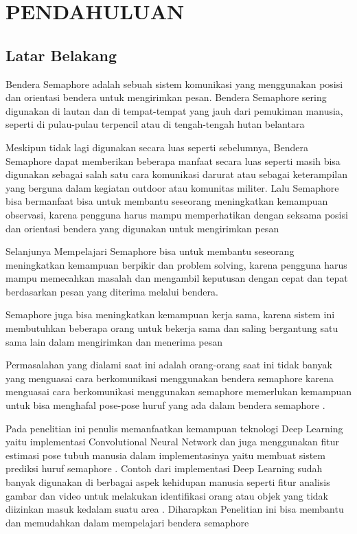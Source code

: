 \section{PENDAHULUAN}

\subsection{Latar Belakang}

Bendera Semaphore adalah sebuah sistem komunikasi yang menggunakan posisi dan orientasi bendera untuk mengirimkan pesan. Bendera Semaphore sering digunakan di lautan dan di tempat-tempat yang jauh dari pemukiman manusia, seperti di pulau-pulau terpencil atau di tengah-tengah hutan belantara

Meskipun tidak lagi digunakan secara luas seperti sebelumnya, Bendera Semaphore dapat memberikan beberapa manfaat secara luas seperti  masih bisa digunakan sebagai salah satu cara komunikasi darurat atau sebagai keterampilan yang berguna dalam kegiatan outdoor atau komunitas militer. Lalu Semaphore bisa bermanfaat bisa untuk membantu seseorang meningkatkan kemampuan observasi, karena pengguna harus mampu memperhatikan dengan seksama posisi dan orientasi bendera yang digunakan untuk mengirimkan pesan

Selanjunya Mempelajari Semaphore bisa untuk  membantu seseorang meningkatkan kemampuan berpikir dan problem solving, karena pengguna harus mampu memecahkan masalah dan mengambil keputusan dengan cepat dan tepat berdasarkan pesan yang diterima melalui bendera. 

Semaphore juga bisa meningkatkan kemampuan kerja sama, karena sistem ini membutuhkan beberapa orang untuk bekerja sama dan saling bergantung satu sama lain dalam mengirimkan dan menerima pesan

Permasalahan yang dialami saat ini adalah orang-orang saat ini tidak banyak yang menguasai cara berkomunikasi menggunakan bendera semaphore karena menguasai cara berkomunikasi menggunakan semaphore memerlukan kemampuan untuk bisa menghafal pose-pose huruf yang ada dalam bendera semaphore . 

Pada penelitian ini penulis memanfaatkan kemampuan teknologi Deep Learning yaitu implementasi Convolutional Neural Network dan juga menggunakan fitur estimasi pose tubuh manusia dalam implementasinya yaitu membuat sistem prediksi huruf semaphore . Contoh dari implementasi Deep Learning sudah banyak digunakan di berbagai aspek kehidupan manusia seperti fitur analisis gambar dan video untuk melakukan identifikasi orang atau objek yang tidak diizinkan masuk kedalam suatu area . Diharapkan Penelitian ini bisa membantu dan memudahkan dalam mempelajari bendera semaphore

